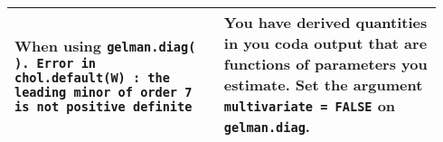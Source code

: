 \documentclass[12pt,english]{article}
\begin{document}
\begin{center}
\begin{longtable}{|p{0.46\linewidth}|p{0.48\linewidth}|}
\hline 
When using \texttt{gelman.diag( ). Error in chol.default(W) : the leading minor of order 7 is not positive definite} & You have derived quantities in you coda output that are functions of parameters you estimate. Set the argument \texttt{multivariate = FALSE} on \texttt{gelman.diag}.\\
\hline 
\end{longtable}
\end{center}




\newpage
\printindex{}
\end{document}
